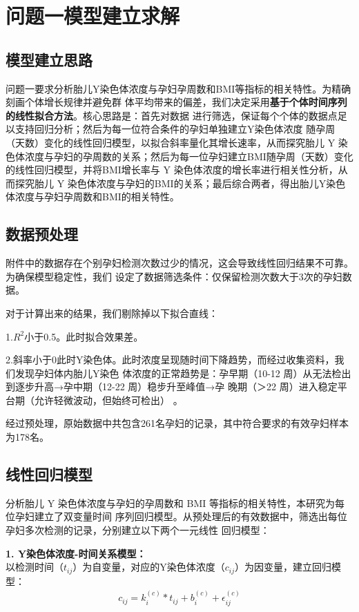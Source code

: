 \documentclass{article}
\begin{document}
\section{\textbf{问题一模型建立求解}}
\subsection{\textbf{模型建立思路}}
问题一要求分析胎儿Y染色体浓度与孕妇孕周数和BMI等指标的相关特性。为精确刻画个体增长规律并避免群
体平均带来的偏差，我们决定采用\textbf{基于个体时间序列的线性拟合方法}。核心思路是：首先对数据
进行筛选，保证每个个体的数据点足以支持回归分析；然后为每一位符合条件的孕妇单独建立Y染色体浓度
随孕周（天数）变化的线性回归模型，以拟合斜率量化其增长速率，从而探究胎儿 Y 染色体浓度与孕妇的孕周数的关系；然后为每一位孕妇建立BMI随孕周（天数）变化的线性回归模型，并将BMI增长率与 Y 染色体浓度的增长率进行相关性分析，从而探究胎儿 Y 染色体浓度与孕妇的BMI的关系；最后综合两者，得出胎儿Y染色体浓度与孕妇孕周数和BMI的相关特性。

\subsection{\textbf{数据预处理}}
附件中的数据存在个别孕妇检测次数过少的情况，这会导致线性回归结果不可靠。为确保模型稳定性，我们
设定了数据筛选条件：仅保留检测次数大于3次的孕妇数据。

对于计算出来的结果，我们剔除掉以下拟合直线：

1.$R^2$小于0.5。此时拟合效果差。

2.斜率小于0此时Y染色体。此时浓度呈现随时间下降趋势，而经过收集资料，我们发现孕妇体内胎儿Y染色
体浓度的正常趋势是：孕早期（10-12 周）从无法检出到逐步升高→孕中期（12-22 周）稳步升至峰值→孕
晚期（＞22 周）进入稳定平台期（允许轻微波动，但始终可检出） 。

经过预处理，原始数据中共包含261名孕妇的记录，其中符合要求的有效孕妇样本为178名。
\subsection{\textbf{线性回归模型}}
分析胎儿 Y 染色体浓度与孕妇的孕周数和 BMI 等指标的相关特性，本研究为每位孕妇建立了双变量时间
序列回归模型。从预处理后的有效数据中，筛选出每位孕妇多次检测的记录，分别建立以下两个一元线性
回归模型：

\textbf{1. Y染色体浓度-时间关系模型：}\\
以检测时间（$t_{ij}$）为自变量，对应的Y染色体浓度（$c_{ij}$）为因变量，建立回归模型：
\begin{gather}
    c_{ij}=k_i^{(c)}*t_{ij}+b_i^{(c)}+\epsilon_{ij}^{(c)} \tag{1}
\end{gather}
\end{document}
